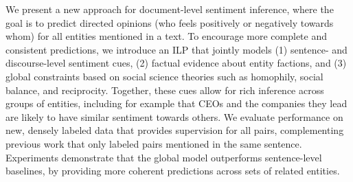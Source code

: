 We present a new approach for document-level sentiment inference, where the goal is to predict directed opinions (who feels positively or negatively towards whom) for all entities mentioned in a text. To encourage more complete and consistent predictions, we introduce an ILP that jointly models (1) sentence- and discourse-level sentiment cues, (2) factual evidence about entity factions, and (3) global constraints based on social science theories such as homophily, social balance, and reciprocity. Together, these cues allow for rich inference across groups of entities, including for example that CEOs and the companies they lead are likely to have similar sentiment towards others. We evaluate performance on new, densely labeled data that provides supervision for all pairs, complementing previous work that only labeled pairs mentioned in the same sentence. Experiments demonstrate that the global model outperforms sentence-level baselines, by providing more coherent predictions across sets of related entities.
